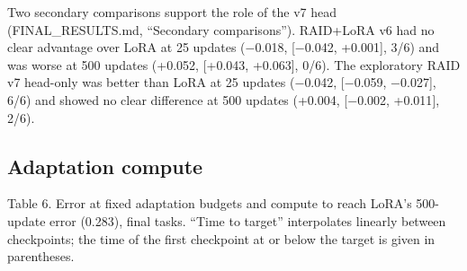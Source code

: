 \documentclass[11pt,a4paper]{article}
\begin{document}
Two secondary comparisons support the role of the v7 head (FINAL\_RESULTS.md, ``Secondary comparisons''). RAID+LoRA v6 had no clear advantage over LoRA at 25 updates (\ensuremath{-}0.018, {[}\ensuremath{-}0.042, +0.001{]}, 3/6) and was worse at 500 updates (+0.052, {[}+0.043, +0.063{]}, 0/6). The exploratory RAID v7 head-only was better than LoRA at 25 updates (\ensuremath{-}0.042, {[}\ensuremath{-}0.059, \ensuremath{-}0.027{]}, 6/6) and showed no clear difference at 500 updates (+0.004, {[}\ensuremath{-}0.002, +0.011{]}, 2/6).

\subsection{Adaptation compute}


Table 6. Error at fixed adaptation budgets and compute to reach LoRA's 500-update error (0.283), final tasks. ``Time to target'' interpolates linearly between checkpoints; the time of the first checkpoint at or below the target is given in parentheses.
\end{document}

